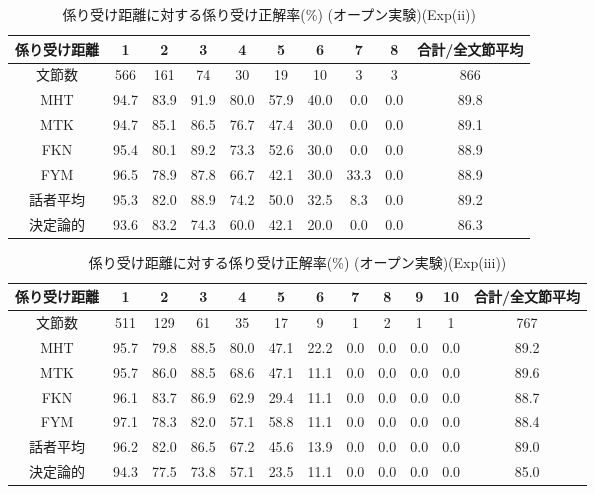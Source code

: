 \begin{table}
\begin{center}
\caption{係り受け距離に対する係り受け正解率(\%) (オープン実験)(Exp(ii))}
\label{res:13}
\footnotesize
\begin{tabular}{|c|c|c|c|c|c|c|c|c||c|}
\hline
係り受け距離		&1&2&3&4&5&6&7&8&合計/全文節平均\\
\hline
\hline
文節数		&566&161&74&30&19&10&3&3&866\\
\hline
MHT		&94.7&83.9&91.9&80.0&57.9&40.0&0.0&0.0&89.8\\
MTK		&94.7&85.1&86.5&76.7&47.4&30.0&0.0&0.0&89.1\\
FKN		&95.4&80.1&89.2&73.3&52.6&30.0&0.0&0.0&88.9\\
FYM		&96.5&78.9&87.8&66.7&42.1&30.0&33.3&0.0&88.9\\
話者平均            &95.3&82.0&88.9&74.2&50.0&32.5&8.3&0.0&89.2\\
\hline
決定論的	&93.6&83.2&74.3&60.0&42.1&20.0&0.0&0.0&86.3\\
\hline
\end{tabular}
\normalsize
\end{center}
\end{table}

\begin{table}
\begin{center}
\caption{係り受け距離に対する係り受け正解率(\%) (オープン実験)(Exp(iii))}
\label{res:14}
\footnotesize
\begin{tabular}{|c|c|c|c|c|c|c|c|c|c|c||c|}
\hline
係り受け距離		&1&2&3&4&5&6&7&8&9&10&合計/全文節平均\\
\hline
\hline
文節数		&511&129&61&35&17&9&1&2&1&1&767\\
\hline
MHT		&95.7&79.8&88.5&80.0&47.1&22.2&0.0&0.0&0.0&0.0&89.2\\
MTK		&95.7&86.0&88.5&68.6&47.1&11.1&0.0&0.0&0.0&0.0&89.6\\
FKN		&96.1&83.7&86.9&62.9&29.4&11.1&0.0&0.0&0.0&0.0&88.7\\
FYM		&97.1&78.3&82.0&57.1&58.8&11.1&0.0&0.0&0.0&0.0&88.4\\
話者平均            &96.2&82.0&86.5&67.2&45.6&13.9&0.0&0.0&0.0&0.0&89.0\\
\hline
決定論的	&94.3&77.5&73.8&57.1&23.5&11.1&0.0&0.0&0.0&0.0&85.0\\
\hline
\end{tabular}
\normalsize
\end{center}
\vspace{3mm}
\end{table}

